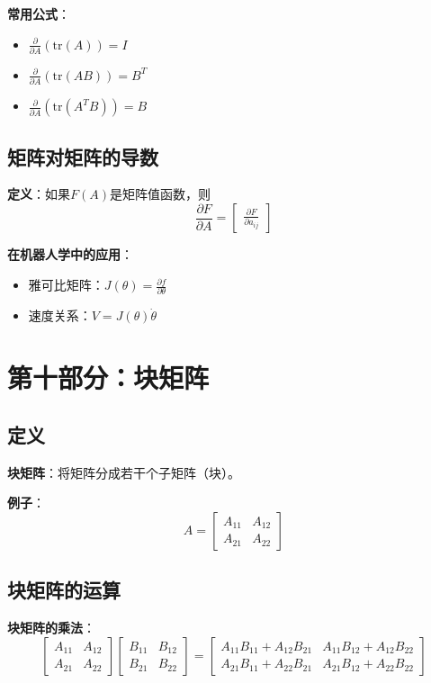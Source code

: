 \documentclass[12pt,a4paper]{article}
\begin{document}
\textbf{常用公式}：
\begin{itemize}
\item $\frac{\partial}{\partial A}(\text{tr}(A)) = I$
\item $\frac{\partial}{\partial A}(\text{tr}(AB)) = B^T$
\item $\frac{\partial}{\partial A}(\text{tr}(A^T B)) = B$
\end{itemize}

\subsection{矩阵对矩阵的导数}

\textbf{定义}：如果$F(A)$是矩阵值函数，则
\begin{equation}
\frac{\partial F}{\partial A} = \begin{bmatrix} \frac{\partial F}{\partial a_{ij}} \end{bmatrix}
\end{equation}

\textbf{在机器人学中的应用}：
\begin{itemize}
\item 雅可比矩阵：$J(\theta) = \frac{\partial f}{\partial \theta}$
\item 速度关系：$V = J(\theta) \dot{\theta}$
\end{itemize}

\section{第十部分：块矩阵}

\subsection{定义}

\textbf{块矩阵}：将矩阵分成若干个子矩阵（块）。

\textbf{例子}：
\begin{equation}
A = \begin{bmatrix} A_{11} & A_{12} \\ A_{21} & A_{22} \end{bmatrix}
\end{equation}

\subsection{块矩阵的运算}

\textbf{块矩阵的乘法}：
\begin{equation}
\begin{bmatrix} A_{11} & A_{12} \\ A_{21} & A_{22} \end{bmatrix} \begin{bmatrix} B_{11} & B_{12} \\ B_{21} & B_{22} \end{bmatrix} = \begin{bmatrix} A_{11}B_{11} + A_{12}B_{21} & A_{11}B_{12} + A_{12}B_{22} \\ A_{21}B_{11} + A_{22}B_{21} & A_{21}B_{12} + A_{22}B_{22} \end{bmatrix}
\end{equation}
\end{document}
